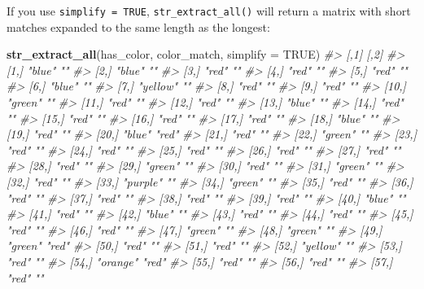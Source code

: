\documentclass[]{book}
\newenvironment{Shaded}{\begin{snugshade}}{\end{snugshade}}
\newcommand{\KeywordTok}[1]{\textcolor[rgb]{0.13,0.29,0.53}{\textbf{#1}}}
\newcommand{\DataTypeTok}[1]{\textcolor[rgb]{0.13,0.29,0.53}{#1}}
\newcommand{\CommentTok}[1]{\textcolor[rgb]{0.56,0.35,0.01}{\textit{#1}}}
\newcommand{\OtherTok}[1]{\textcolor[rgb]{0.56,0.35,0.01}{#1}}
\newcommand{\NormalTok}[1]{#1}
\begin{document}
If you use \texttt{simplify\ =\ TRUE}, \texttt{str\_extract\_all()} will
return a matrix with short matches expanded to the same length as the
longest:

\begin{Shaded}
\begin{Highlighting}[]
\KeywordTok{str_extract_all}\NormalTok{(has_color, color_match, }\DataTypeTok{simplify =} \OtherTok{TRUE}\NormalTok{)}
\CommentTok{#>       [,1]     [,2] }
\CommentTok{#>  [1,] "blue"   ""   }
\CommentTok{#>  [2,] "blue"   ""   }
\CommentTok{#>  [3,] "red"    ""   }
\CommentTok{#>  [4,] "red"    ""   }
\CommentTok{#>  [5,] "red"    ""   }
\CommentTok{#>  [6,] "blue"   ""   }
\CommentTok{#>  [7,] "yellow" ""   }
\CommentTok{#>  [8,] "red"    ""   }
\CommentTok{#>  [9,] "red"    ""   }
\CommentTok{#> [10,] "green"  ""   }
\CommentTok{#> [11,] "red"    ""   }
\CommentTok{#> [12,] "red"    ""   }
\CommentTok{#> [13,] "blue"   ""   }
\CommentTok{#> [14,] "red"    ""   }
\CommentTok{#> [15,] "red"    ""   }
\CommentTok{#> [16,] "red"    ""   }
\CommentTok{#> [17,] "red"    ""   }
\CommentTok{#> [18,] "blue"   ""   }
\CommentTok{#> [19,] "red"    ""   }
\CommentTok{#> [20,] "blue"   "red"}
\CommentTok{#> [21,] "red"    ""   }
\CommentTok{#> [22,] "green"  ""   }
\CommentTok{#> [23,] "red"    ""   }
\CommentTok{#> [24,] "red"    ""   }
\CommentTok{#> [25,] "red"    ""   }
\CommentTok{#> [26,] "red"    ""   }
\CommentTok{#> [27,] "red"    ""   }
\CommentTok{#> [28,] "red"    ""   }
\CommentTok{#> [29,] "green"  ""   }
\CommentTok{#> [30,] "red"    ""   }
\CommentTok{#> [31,] "green"  ""   }
\CommentTok{#> [32,] "red"    ""   }
\CommentTok{#> [33,] "purple" ""   }
\CommentTok{#> [34,] "green"  ""   }
\CommentTok{#> [35,] "red"    ""   }
\CommentTok{#> [36,] "red"    ""   }
\CommentTok{#> [37,] "red"    ""   }
\CommentTok{#> [38,] "red"    ""   }
\CommentTok{#> [39,] "red"    ""   }
\CommentTok{#> [40,] "blue"   ""   }
\CommentTok{#> [41,] "red"    ""   }
\CommentTok{#> [42,] "blue"   ""   }
\CommentTok{#> [43,] "red"    ""   }
\CommentTok{#> [44,] "red"    ""   }
\CommentTok{#> [45,] "red"    ""   }
\CommentTok{#> [46,] "red"    ""   }
\CommentTok{#> [47,] "green"  ""   }
\CommentTok{#> [48,] "green"  ""   }
\CommentTok{#> [49,] "green"  "red"}
\CommentTok{#> [50,] "red"    ""   }
\CommentTok{#> [51,] "red"    ""   }
\CommentTok{#> [52,] "yellow" ""   }
\CommentTok{#> [53,] "red"    ""   }
\CommentTok{#> [54,] "orange" "red"}
\CommentTok{#> [55,] "red"    ""   }
\CommentTok{#> [56,] "red"    ""   }
\CommentTok{#> [57,] "red"    ""}
\end{Highlighting}
\end{Shaded}
\end{document}
